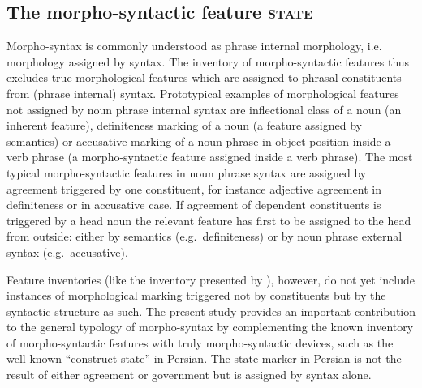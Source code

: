 \subsection{The morpho-syntactic feature \textsc{state}}
Morpho-syntax is commonly understood as phrase internal morphology, i.e. morphology assigned by syntax. The inventory of morpho-syntactic features thus excludes true morphological features which are assigned to phrasal constituents from (phrase internal) syntax. Prototypical examples of morphological features not assigned by noun phrase internal syntax are inflectional class of a noun (an inherent feature), definiteness marking of a noun (a feature assigned by semantics) or accusative marking of a noun phrase in object position inside a verb phrase (a morpho-syntactic feature assigned inside a verb phrase). The most typical morpho-syntactic features in noun phrase syntax are assigned by agreement triggered by one constituent, for instance adjective agreement in definiteness or in accusative case. If agreement of dependent constituents is triggered by a head noun the relevant feature has first to be assigned to the head from outside: either by semantics (e.g.~definiteness) or by noun phrase external syntax (e.g.~accusative). 

Feature inventories (like the inventory presented by \citealt{kibort2010a}), however, do not yet include instances of morphological marking triggered not by constituents but by the syntactic structure as such. The present study provides an important contribution to the general typology of morpho-syntax by complementing the known inventory of morpho-syntactic features with truly morpho-syntactic devices, such as the well-known “construct state” in Persian. The state marker in Persian is not the result of either agreement or government but is assigned by syntax alone.

